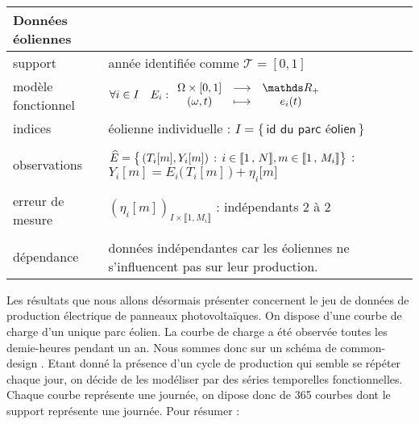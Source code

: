 \bigskip

\noalign\begin{tabularx}{\textwidth}{XX}
	\toprule
	\textbf{Données éoliennes}                                                                                                                                                                                         \\
	\midrule
	support            & année identifiée comme $\mathcal T = [0,1]$                                                                                                                                                          \\
	modèle fonctionnel & $\forall i \in I \quad E_i : \func {\Omega \times [0,1]} {\mathds R_+} {(\omega, t)} {e_i(t)}$                                                                                                \\
	indices            & éolienne individuelle : $I = \bigl\{ \, \textsf{id du parc éolien} \,\bigr\}$                                                                                                                  \\
	\\
	observations       & $\widehat E = \bigl\{ \, (T_i[m], Y_i[m]) \, : \, i \in \llbracket 1 \, , \, N \rrbracket, m \in \llbracket 1 \, , \, M_i \rrbracket \bigr\}$ : $Y_i[m] = E_i\bigl( \, T_i[m] \, \bigr) + \eta_i\bigl[ m \bigr]$ \\
	\\
	erreur de mesure   & $(\eta_i[m])_{I\times\llbracket 1, M_i \rrbracket}$ : indépendants 2 à 2                                                                                                                                                                 \\
	\\
	dépendance         & données indépendantes car les éoliennes ne s'influencent pas sur leur production.                                                                                             \\
	\bottomrule
\end{tabularx}


Les résultats que nous allons désormais présenter concernent le jeu de données de production électrique de panneaux photovoltaïques. On dispose d'une courbe de charge d'un unique parc éolien. La courbe de charge a été observée toutes les demie-heures pendant un an. Nous sommes donc sur un schéma de \og common-design \fg. Etant donné la présence d'un \og cycle de production \fg qui semble se répéter chaque jour, on décide de les modéliser par des séries temporelles fonctionnelles. Chaque courbe représente une journée, on dipose donc de 365 courbes dont le support représente une journée. Pour résumer :


